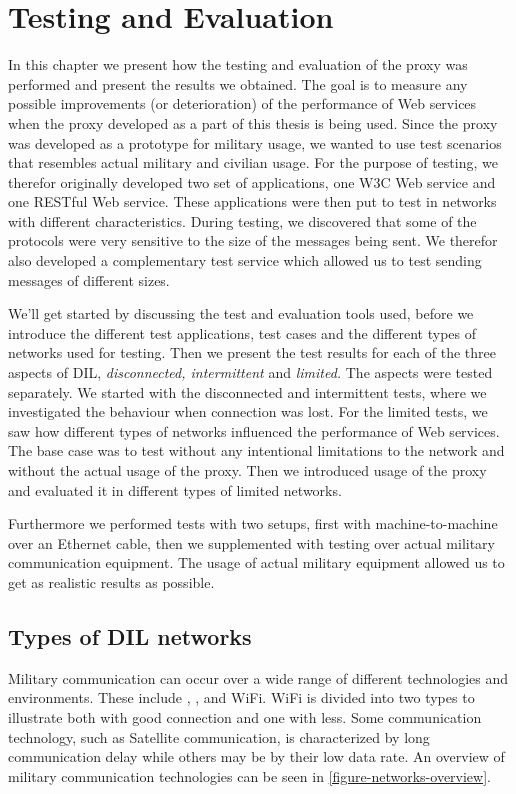 \chapter{Testing and Evaluation}

In this chapter we present how the testing and evaluation of the proxy was
performed and present the results we obtained.  The goal is to measure any
possible improvements (or deterioration) of the performance of Web services when
the proxy developed as a part of this thesis is being used. Since the proxy was
developed as a prototype for military usage, we wanted to use test scenarios
that resembles actual military and civilian usage. For the purpose of testing,
we therefor originally developed two set of applications, one W3C Web service
and one RESTful Web service. These applications were then put to test in
networks with different characteristics. During testing, we discovered that some
of the protocols were very sensitive to the size of the messages being sent. We
therefor also developed a complementary test service which allowed us to test
sending messages of different sizes.

We'll get started by discussing the test and evaluation tools used, before we
introduce the different test applications, test cases and the different types
of networks used for testing. Then we present the test results for each of the
three aspects of DIL, \textit{disconnected, intermittent} and
\textit{limited.} The aspects were tested separately. We started with the
disconnected and intermittent tests, where we investigated the behaviour when
connection was lost. For the limited tests, we saw how different types of
networks influenced the performance of Web services. The base case was to
test without any intentional limitations to the network and without the actual
usage of the proxy. Then we introduced usage of the proxy and evaluated it in
different types of limited networks.

Furthermore we performed tests with two setups, first with machine-to-machine
over an Ethernet cable, then we supplemented with testing over actual military
communication equipment. The usage of actual military equipment allowed us to
get as realistic results as possible.

\section{Types of DIL networks}

Military communication can occur over a wide range of different technologies and
environments. These include , ,
 and WiFi. WiFi is divided into two types to illustrate both
with good connection and one with less. Some communication technology, such as
Satellite communication, is characterized by long communication delay while
others may be by their low data rate. An overview of military communication
technologies can be seen in \cref{figure-networks-overview}.

